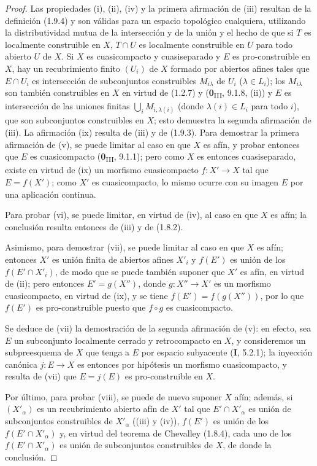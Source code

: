 \begin{proof}
Las propiedades (i), (ii), (iv) y la primera afirmación de (iii) resultan
de la definición (1.9.4) y son válidas para un espacio topológico
cualquiera, utilizando la distributividad mutua de la intersección y de
la unión y el hecho de que si $T$ es localmente construible en $X$,
$T\cap U$ es localmente construible en $U$ para todo abierto $U$ de $X$.
Si $X$ es cuasicompacto y cuasiseparado y $E$ es pro-construible en
$X$, hay un recubrimiento finito $(U_i)$ de $X$ formado por abiertos afines tales
que $E\cap U_i$ es intersección de subconjuntos construibles $M_{i\lambda}$
de $U_i$ ($\lambda\in L_i$); los $M_{i\lambda}$ son también construibles
en $X$ en virtud de (1.2.7) y (\textbf{0}\textsubscript{III}, 9.1.8, (ii)) y $E$ es
intersección de las uniones finitas $\bigcup_iM_{i,\lambda(i)}$ (donde
$\lambda(i)\in L_i$ para todo $i$), que son subconjuntos construibles en
$X$; esto demuestra la segunda afirmación de (iii). La afirmación (ix) resulta
de (iii) y de (1.9.3). Para demostrar la primera afirmación de (v), se puede
limitar al caso en que $X$ es afín, y probar entonces que $E$ es
cuasicompacto (\textbf{0}\textsubscript{III}, 9.1.1); pero como $X$ es entonces
cuasiseparado, existe en virtud de (ix) un morfismo cuasicompacto
$f:X'\to X$ tal que $E=f(X')$; como $X'$ es cuasicompacto, lo mismo
ocurre con su imagen $E$ por una aplicación continua.

Para probar (vi), se puede limitar, en virtud de (iv), al caso en que $X$ es
afín; la conclusión resulta entonces de (iii) y de (1.8.2).


Asimismo, para demostrar (vii), se puede limitar al caso en que $X$ es afín;
entonces $X'$ es unión finita de abiertos afines $X'_i$ y $f(E')$ es unión
de los $f(E'\cap X'_i)$, de modo que se puede también suponer que $X'$ es afín,
en virtud de (ii); pero entonces $E'=g(X'')$, donde $g:X''\to X'$ es un morfismo
cuasicompacto, en virtud de (ix), y se tiene $f(E')=f(g(X''))$, por lo que $f(E')$ es
pro-construible puesto que $f\circ g$ es cuasicompacto.

Se deduce de (vii) la demostración de la segunda afirmación de (v): en
efecto, sea $E$ un subconjunto localmente cerrado y retrocompacto en $X$, y
consideremos un subpreesquema de $X$ que tenga a $E$ por espacio subyacente (\textbf{I},
5.2.1); la inyección canónica $j:E\to X$ es entonces por hipótesis un
morfismo cuasicompacto, y resulta de (vii) que $E=j(E)$ es
pro-construible en $X$.

Por último, para probar (viii), se puede de nuevo suponer $X$ afín; además, si
$(X'_\alpha)$ es un recubrimiento abierto afín de $X'$ tal que
$E'\cap X'_\alpha$ es unión de subconjuntos construibles de $X'_\alpha$
((iii) y (iv)), $f(E')$ es unión de los $f(E'\cap X'_\alpha)$ y, en virtud
del teorema de Chevalley (1.8.4), cada uno de los $f(E'\cap X'_\alpha)$ es
unión de subconjuntos construibles de $X$, de donde la conclusión.
\end{proof}

